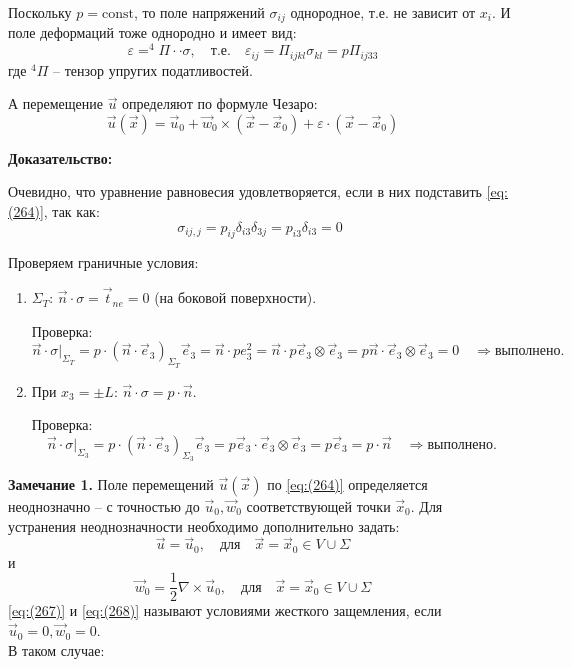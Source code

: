 Поскольку \( p = \text{const} \), то поле напряжений \( \sigma_{ij} \) однородное, т.е. не зависит от \( x_i \). И поле деформаций тоже однородно и имеет вид:
\begin{equation}
\varepsilon = ^4\Pi \cdot\cdot \sigma, \quad \text{т.е.} \quad \varepsilon_{ij} = \Pi _{ijkl} \sigma_{kl} = p \Pi _{ij33} \quad \label{eq:(265)}
\end{equation}
где \( ^4\Pi\) – тензор упругих податливостей.

А перемещение \( \vec{u} \) определяют по формуле Чезаро:
\begin{equation}
\vec{u}(\vec{x}) = \vec{u}_0 + \vec{w}_0 \times (\vec{x} - \vec{x}_0) + \varepsilon \cdot (\vec{x} - \vec{x}_0) \quad \label{eq:(266)}
\end{equation}

\textbf{Доказательство:}

Очевидно, что уравнение равновесия удовлетворяется, если в них подставить \ref{eq:(264)}, так как:
\[
\sigma_{ij,j} = p_{ij} \delta_{i3} \delta_{3j} = p_{i3} \delta_{i3} = 0
\]

Проверяем граничные условия:
\begin{enumerate}
    \item  \( \Sigma_T \): \( \vec{n} \cdot \sigma = \vec{t}_{ne} = 0 \) (на боковой поверхности).

Проверка:
\[
\vec{n} \cdot \sigma|_{\Sigma_T} 
= p \cdot (\vec{n} \cdot \vec{e}_3)_{\Sigma_T} \vec{e}_3 
= \vec{n} \cdot p e_3^2
= \vec{n} \cdot p \vec{e}_3 \otimes \vec{e}_3 
= p \vec{n} \cdot \vec{e}_3 \otimes \vec{e}_3 = 0 \quad \Rightarrow \text{выполнено}.
\]
\item При \( x_3 = \pm L \): \( \vec{n} \cdot \sigma = p \cdot \vec{n} \).

Проверка:
\[
\vec{n} \cdot \sigma|_{\Sigma_3} = p \cdot (\vec{n} \cdot \vec{e}_3)_{\Sigma_3} \vec{e}_3 = p \vec{e}_3 \cdot \vec{e}_3 \otimes \vec{e}_3 = p \vec{e}_3 = p \cdot \vec{n} \quad \Rightarrow \text{выполнено}.
\]
\end{enumerate}

\textbf{Замечание 1.} Поле перемещений \( \vec{u}(\vec{x}) \) по \ref{eq:(264)} определяется неоднозначно – с точностью до \( \vec{u}_0, \vec{w}_0 \) соответствующей точки \( \vec{x}_0 \). Для устранения неоднозначности необходимо дополнительно задать:
\begin{equation}
\vec{u} = \vec{u}_0, \quad \text{для} \quad \vec{x} = \vec{x}_0 \in V \cup \Sigma \quad \label{eq:(267)}
\end{equation}
и
\begin{equation}
\vec{w}_0 = \frac{1}{2} \nabla \times \vec{u}_0, \quad \text{для} \quad \vec{x} = \vec{x}_0 \in V \cup \Sigma \quad \label{eq:(268)}
\end{equation}
\ref{eq:(267)} и \ref{eq:(268)} называют условиями жесткого защемления, если \( \vec{u}_0 = 0, \vec{w}_0 = 0 \). \\В таком случае:

